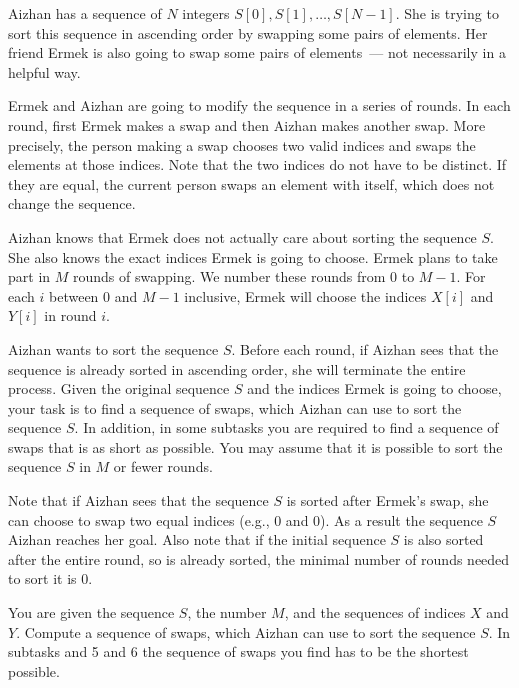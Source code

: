 Aizhan has a sequence of $N$ integers $S[0], S[1], \ldots, S[N - 1]$. She is trying to sort this sequence in ascending order by swapping some
 pairs of elements. Her friend Ermek is also going to swap some pairs of elements~--- not necessarily in a helpful way.

Ermek and Aizhan are going to modify the sequence in a series of rounds. In each round, first Ermek makes a swap and then Aizhan makes another swap. More precisely, the person making a swap chooses two valid indices and swaps the elements at those indices. Note that the two indices do not have to be distinct. If they are equal, the current person swaps an element with itself, which does not change the sequence.

Aizhan knows that Ermek does not actually care about sorting the sequence $S$. She also knows the exact indices Ermek is going to choose. Ermek plans to take part in $M$ rounds of swapping. We number these rounds from $0$ to $M - 1$. For each $i$ between $0$ and $M - 1$ inclusive, Ermek will choose the indices $X[i]$ and $Y[i]$ in round $i$.

Aizhan wants to sort the sequence $S$. Before each round, if Aizhan sees that the sequence is already sorted in ascending order, she will terminate the entire process. Given the original sequence $S$ and the indices Ermek is going to choose, your task is to find a sequence of swaps, which Aizhan can use to sort the sequence $S$. In addition, in some subtasks you are required to find a sequence of swaps that is as short as possible. You may assume that it is possible to sort the sequence $S$ in $M$ or fewer rounds.

Note that if Aizhan sees that the sequence $S$ is sorted after Ermek's swap, she can choose to swap two equal indices (e.g., 0 and 0). As a result the sequence $S$ Aizhan reaches her goal. Also note that if the initial sequence $S$ is also sorted after the entire round, so is already sorted, the minimal number of rounds needed to sort it is 0.

You are given the sequence $S$, the number $M$, and the sequences of indices $X$ and $Y$. Compute a sequence of swaps, which Aizhan can use to sort the sequence $S$. In subtasks and 5 and 6 the sequence of swaps you find has to be the shortest possible.

